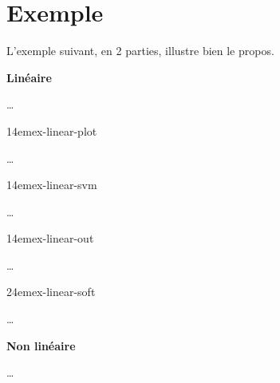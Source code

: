 \section{Exemple}

L’exemple suivant, en 2 parties, illustre bien le propos.

\textbf{Linéaire} \cite{ex-linear}

…

{14em}{ex-linear-plot}

…

{14em}{ex-linear-svm}

…

{14em}{ex-linear-out}

…

{24em}{ex-linear-soft}

…

\pagebreak

\textbf{Non linéaire} \cite{ex-nonlinear}

…

\pagebreak
